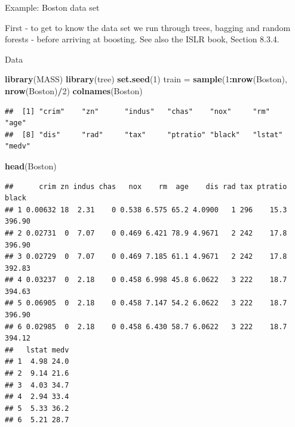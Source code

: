 \documentclass[ignorenonframetext,]{beamer}
\newenvironment{Shaded}{\begin{snugshade}}{\end{snugshade}}
\newcommand{\KeywordTok}[1]{\textcolor[rgb]{0.13,0.29,0.53}{\textbf{#1}}}
\newcommand{\DecValTok}[1]{\textcolor[rgb]{0.00,0.00,0.81}{#1}}
\newcommand{\StringTok}[1]{\textcolor[rgb]{0.31,0.60,0.02}{#1}}
\newcommand{\OperatorTok}[1]{\textcolor[rgb]{0.81,0.36,0.00}{\textbf{#1}}}
\newcommand{\NormalTok}[1]{#1}
\begin{document}
\begin{frame}[fragile]{Example: Boston data set}

First - to get to know the data set we run through trees, bagging and
random forests - before arriving at boosting. See also the ISLR book,
Section 8.3.4.

\begin{block}{Data}

\begin{Shaded}
\begin{Highlighting}[]
\KeywordTok{library}\NormalTok{(MASS)}
\KeywordTok{library}\NormalTok{(tree)}
\KeywordTok{set.seed}\NormalTok{(}\DecValTok{1}\NormalTok{)}
\NormalTok{train =}\StringTok{ }\KeywordTok{sample}\NormalTok{(}\DecValTok{1}\OperatorTok{:}\KeywordTok{nrow}\NormalTok{(Boston), }\KeywordTok{nrow}\NormalTok{(Boston)}\OperatorTok{/}\DecValTok{2}\NormalTok{)}
\KeywordTok{colnames}\NormalTok{(Boston)}
\end{Highlighting}
\end{Shaded}

\begin{verbatim}
##  [1] "crim"    "zn"      "indus"   "chas"    "nox"     "rm"      "age"    
##  [8] "dis"     "rad"     "tax"     "ptratio" "black"   "lstat"   "medv"
\end{verbatim}

\begin{Shaded}
\begin{Highlighting}[]
\KeywordTok{head}\NormalTok{(Boston)}
\end{Highlighting}
\end{Shaded}

\begin{verbatim}
##      crim zn indus chas   nox    rm  age    dis rad tax ptratio  black
## 1 0.00632 18  2.31    0 0.538 6.575 65.2 4.0900   1 296    15.3 396.90
## 2 0.02731  0  7.07    0 0.469 6.421 78.9 4.9671   2 242    17.8 396.90
## 3 0.02729  0  7.07    0 0.469 7.185 61.1 4.9671   2 242    17.8 392.83
## 4 0.03237  0  2.18    0 0.458 6.998 45.8 6.0622   3 222    18.7 394.63
## 5 0.06905  0  2.18    0 0.458 7.147 54.2 6.0622   3 222    18.7 396.90
## 6 0.02985  0  2.18    0 0.458 6.430 58.7 6.0622   3 222    18.7 394.12
##   lstat medv
## 1  4.98 24.0
## 2  9.14 21.6
## 3  4.03 34.7
## 4  2.94 33.4
## 5  5.33 36.2
## 6  5.21 28.7
\end{verbatim}

\end{block}

\end{frame}
\end{document}
